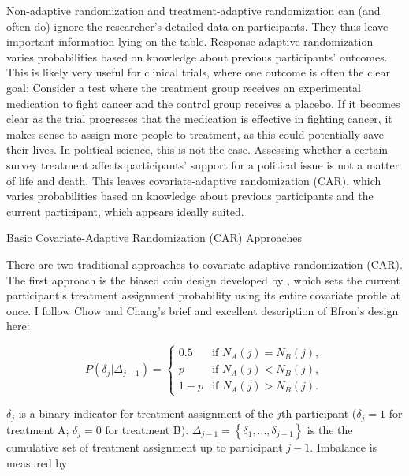 \documentclass[12pt,]{article}
\makeatletter
\renewcommand\paragraph{\@startsection{paragraph}{4}{\z@}
                                    {-3.25ex \@plus -1ex \@minus -.2ex}
                                    {1.5ex \@plus .2ex}
                                    {\normalsize}} %
\makeatother
\begin{document}
Non-adaptive randomization and treatment-adaptive randomization can (and
often do) ignore the researcher's detailed data on participants. They
thus leave important information lying on the table. Response-adaptive
randomization varies probabilities based on knowledge about previous
participants' outcomes. This is likely very useful for clinical trials,
where one outcome is often the clear goal: Consider a test where the
treatment group receives an experimental medication to fight cancer and
the control group receives a placebo. If it becomes clear as the trial
progresses that the medication is effective in fighting cancer, it makes
sense to assign more people to treatment, as this could potentially save
their lives. In political science, this is not the case. Assessing
whether a certain survey treatment affects participants' support for a
political issue is not a matter of life and death. This leaves
covariate-adaptive randomization (CAR), which varies probabilities based
on knowledge about previous participants and the current participant,
which appears ideally suited.

\paragraph{Basic Covariate-Adaptive Randomization (CAR)
Approaches}\label{seq-car-basic}

There are two traditional approaches to covariate-adaptive randomization
(CAR). The first approach is the biased coin design developed by
\citet{efron_1971_forcing}, which sets the current participant's
treatment assignment probability using its entire covariate profile at
once. I follow Chow and Chang's brief and excellent description of
Efron's design \citep{chow_2007_adaptive} here:

\singlespacing

\vspace{-0.5cm}

\begin{equation*}
  P(\delta_j \lvert \Delta_{j-1}) = 
  \begin{cases}
    0.5 & \text{if $N_A(j) = N_B(j)$},\\
    \text{$p$} & \text{if $N_A(j) < N_B(j)$}, \\
    1 - \text{$p$} & \text{if $N_A(j) > N_B(j)$}.
  \end{cases}
\end{equation*}

\doublespacing

\(\delta_j\) is a binary indicator for treatment assignment of the
\(j\)th participant (\(\delta_j=1\) for treatment A; \(\delta_j=0\) for
treatment B).
\(\Delta_{j-1} = \left\{ \delta_1, ..., \delta_{j-1} \right\}\) is the
the cumulative set of treatment assignment up to participant \(j-1\).
Imbalance is measured by
\end{document}
